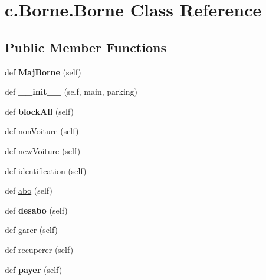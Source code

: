\hypertarget{classc_1_1_borne_1_1_borne}{}\section{c.\+Borne.\+Borne Class Reference}
\label{classc_1_1_borne_1_1_borne}
\subsection*{Public Member Functions}
\begin{DoxyCompactItemize}
\item 
\hypertarget{classc_1_1_borne_1_1_borne_ab772c9dfda0275a2e311725efabd0862}{}def {\bfseries Maj\+Borne} (self)\label{classc_1_1_borne_1_1_borne_ab772c9dfda0275a2e311725efabd0862}

\item 
\hypertarget{classc_1_1_borne_1_1_borne_a3b27cfe137bdac3620e0a849e0e6db1a}{}def {\bfseries \+\_\+\+\_\+init\+\_\+\+\_\+} (self, main, parking)\label{classc_1_1_borne_1_1_borne_a3b27cfe137bdac3620e0a849e0e6db1a}

\item 
\hypertarget{classc_1_1_borne_1_1_borne_a25680f8f48bf5e6a27a300ed3f44efce}{}def {\bfseries block\+All} (self)\label{classc_1_1_borne_1_1_borne_a25680f8f48bf5e6a27a300ed3f44efce}

\item 
def \hyperlink{classc_1_1_borne_1_1_borne_a150158fed34638b91225e0e167bae411}{non\+Voiture} (self)
\item 
def \hyperlink{classc_1_1_borne_1_1_borne_ab31760cc398e90459226f4469d6717ca}{new\+Voiture} (self)
\item 
def \hyperlink{classc_1_1_borne_1_1_borne_aa3275687e521d74395f739d6ce58adbc}{identification} (self)
\item 
def \hyperlink{classc_1_1_borne_1_1_borne_a7e65bf23afacce25d3ed2b0536010c6a}{abo} (self)
\item 
\hypertarget{classc_1_1_borne_1_1_borne_afde50db2768ba57bf0c58eec72ead43e}{}def {\bfseries desabo} (self)\label{classc_1_1_borne_1_1_borne_afde50db2768ba57bf0c58eec72ead43e}

\item 
def \hyperlink{classc_1_1_borne_1_1_borne_ac1483bbf5ae774b661fa1c716728f8a4}{garer} (self)
\item 
def \hyperlink{classc_1_1_borne_1_1_borne_a54ea3e6fc967a947ee06c2a337dcda26}{recuperer} (self)
\item 
\hypertarget{classc_1_1_borne_1_1_borne_a6989f307067a68b34ed8ab98710a3e66}{}def {\bfseries payer} (self)\label{classc_1_1_borne_1_1_borne_a6989f307067a68b34ed8ab98710a3e66}


\end{DoxyCompactItemize}
